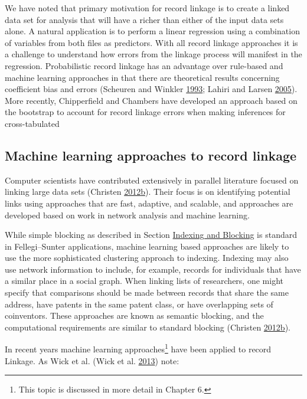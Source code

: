 \documentclass[]{krantz}
\begin{document}
We have noted that primary motivation for record linkage is to create a
linked data set for analysis that will have a richer than either of the
input data sets alone. A natural application is to perform a linear
regression using a combination of variables from both files as
predictors. With all record linkage approaches it is a challenge to
understand how errors from the linkage process will manifest in the
regression. Probabilistic record linkage has an advantage over
rule-based and machine learning approaches in that there are theoretical
results concerning coefficient bias and errors (Scheuren and Winkler
\protect\hyperlink{ref-scheuren1993regression}{1993}; Lahiri and Larsen
\protect\hyperlink{ref-lahiri2005regression}{2005}). More recently,
Chipperfield and Chambers have developed an approach based on the
bootstrap to account for record linkage errors when making inferences
for cross-tabulated

\subsection{Machine learning approaches to record
linkage}\label{machine-learning-approaches-to-record-linkage}

Computer scientists have contributed extensively in parallel literature
focused on linking large data sets (Christen
\protect\hyperlink{ref-christen2012data}{2012}\protect\hyperlink{ref-christen2012data}{b}).
Their focus is on identifying potential links using approaches that are
fast, adaptive, and scalable, and approaches are developed based on work
in network analysis and machine learning.

While simple blocking as described in Section
\protect\hyperlink{S:indexing}{Indexing and Blocking} is standard in
Fellegi--Sunter applications, machine learning based approaches are
likely to use the more sophisticated clustering approach to indexing.
Indexing may also use network information to include, for example,
records for individuals that have a similar place in a social graph.
When linking lists of researchers, one might specify that comparisons
should be made between records that share the same address, have patents
in the same patent class, or have overlapping sets of coinventors. These
approaches are known as semantic blocking, and the computational
requirements are similar to standard blocking (Christen
\protect\hyperlink{ref-christen2012data}{2012}\protect\hyperlink{ref-christen2012data}{b}).

In recent years machine learning approaches\footnote{This topic is
  discussed in more detail in Chapter 6.} have been applied to record
Linkage. As Wick et al. (Wick et al.
\protect\hyperlink{ref-wick2013joint}{2013}) note:
\end{document}
